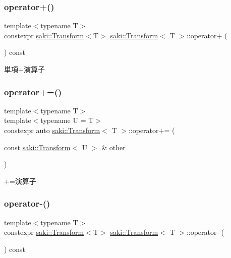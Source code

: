 \subsubsection{\texorpdfstring{operator+()}{operator+()}}
{\footnotesize\ttfamily template$<$typename T$>$ \\
constexpr \mbox{\hyperlink{classsaki_1_1_transform}{saki\+::\+Transform}}$<$T$>$ \mbox{\hyperlink{classsaki_1_1_transform}{saki\+::\+Transform}}$<$ T $>$\+::operator+ (\begin{DoxyParamCaption}{ }\end{DoxyParamCaption}) const\hspace{0.3cm}{\ttfamily [inline]}}



単項+演算子 

\mbox{\label{classsaki_1_1_transform_a42871283dd6c56bd5a452efd91e1076c}} 
\subsubsection{\texorpdfstring{operator+=()}{operator+=()}}
{\footnotesize\ttfamily template$<$typename T$>$ \\
template$<$typename U  = T$>$ \\
constexpr auto \mbox{\hyperlink{classsaki_1_1_transform}{saki\+::\+Transform}}$<$ T $>$\+::operator+= (\begin{DoxyParamCaption}\item[{const \mbox{\hyperlink{classsaki_1_1_transform}{saki\+::\+Transform}}$<$ U $>$ \&}]{other }\end{DoxyParamCaption})\hspace{0.3cm}{\ttfamily [inline]}}



+=演算子 

\mbox{\label{classsaki_1_1_transform_a771da4173222f8200bfdfee101be1e28}} 
\subsubsection{\texorpdfstring{operator-\/()}{operator-()}}
{\footnotesize\ttfamily template$<$typename T$>$ \\
constexpr \mbox{\hyperlink{classsaki_1_1_transform}{saki\+::\+Transform}}$<$T$>$ \mbox{\hyperlink{classsaki_1_1_transform}{saki\+::\+Transform}}$<$ T $>$\+::operator-\/ (\begin{DoxyParamCaption}{ }\end{DoxyParamCaption}) const\hspace{0.3cm}{\ttfamily [inline]}}



